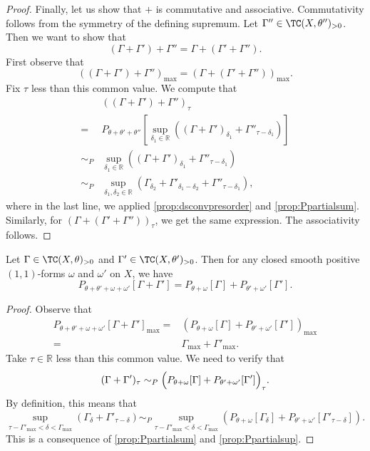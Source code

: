 \begin{proof}
    Finally, let us show that $+$ is commutative and associative. Commutativity follows from the symmetry of the defining supremum. Let $\Gamma''\in \TC(X,\theta'')_{>0}$. Then we want to show that
    \[
    (\Gamma+\Gamma')+\Gamma''=\Gamma+(\Gamma'+\Gamma'').
    \]
    First observe that
    \[
    \left((\Gamma+\Gamma')+\Gamma'' \right)_{\max}=\left( \Gamma+(\Gamma'+\Gamma'')\right)_{\max}.
    \]
    Fix $\tau$ less than this common value. We compute that
    \[
    \begin{aligned}
    &\left( (\Gamma+\Gamma')+\Gamma''\right)_{\tau}\\
    =& P_{\theta+\theta'+\theta''}\left[\sup_{\delta_1\in \mathbb{R}} \left((\Gamma+\Gamma')_{\delta_1}+\Gamma''_{\tau-\delta_1}\right)\right]\\
    \sim_P & \sup_{\delta_1\in \mathbb{R}} \left((\Gamma+\Gamma')_{\delta_1}+\Gamma''_{\tau-\delta_1}\right)\\
    \sim_P & \sup_{\delta_1,\delta_2\in \mathbb{R}} \left(\Gamma_{\delta_2}+\Gamma'_{\delta_1-\delta_2}+\Gamma''_{\tau-\delta_1}\right),
    \end{aligned}
    \]
    where in the last line, we applied \cref{prop:dsconvpresorder} and \cref{prop:Ppartialsum}. Similarly, for $\left( \Gamma+(\Gamma'+\Gamma'')\right)_{\tau}$, we get the same expression. The associativity follows.
\end{proof}

\begin{lemma}\label{lma:testcursumcomp}
    Let $\Gamma \in \TC(X,\theta)_{>0}$ and $\Gamma' \in \TC(X,\theta')_{>0}$. Then for any closed smooth positive $(1,1)$-forms $\omega$ and $\omega'$ on $X$, we have
    \[
    P_{\theta+\theta'+\omega+\omega'}[\Gamma+\Gamma']=P_{\theta+\omega}[\Gamma]+P_{\theta'+\omega'}[\Gamma'].
    \]
\end{lemma}
\begin{proof}
    Observe that
    \[
    \begin{aligned}
    P_{\theta+\theta'+\omega+\omega'}[\Gamma+\Gamma']_{\max}=&\left(P_{\theta+\omega}[\Gamma]+P_{\theta'+\omega'}[\Gamma'] \right)_{\max}\\
    =&\Gamma_{\max}+\Gamma'_{\max}.
    \end{aligned}
    \]
    Take $\tau\in \mathbb{R}$ less than this common value. We need to verify that
    \[
    (\Gamma+\Gamma')_{\tau}\sim_P \Bigl( P_{\theta+\omega}[\Gamma]+P_{\theta'+\omega'}[\Gamma']\Bigr)_{\tau}.
    \]
    By definition, this means that
    \[
    \sup_{\tau-\Gamma'_{\max}<\delta<\Gamma_{\max}}\left(\Gamma_{\delta}+\Gamma'_{\tau-\delta}\right)\sim_P \sup_{\tau-\Gamma'_{\max}<\delta<\Gamma_{\max}}\left(P_{\theta+\omega}[\Gamma_{\delta}]+P_{\theta'+\omega'}[\Gamma'_{\tau-\delta}]\right).
    \]
    This is a consequence of \cref{prop:Ppartialsum} and \cref{prop:Ppartialsup}.
\end{proof}


